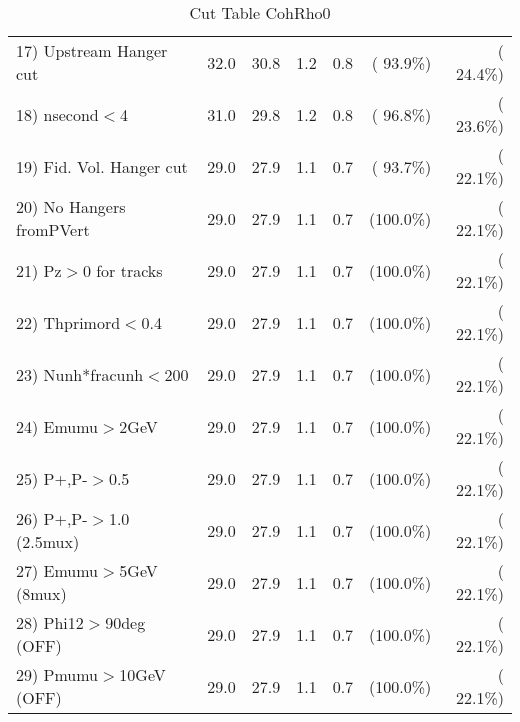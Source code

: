 \begin{table}[h!]
\begin{tabular}{||l||r|r|r|r|r|r||}
 17) Upstream Hanger cut  &         32.0 &         30.8 &          1.2 &          0.8 & ( 93.9\%) & ( 24.4\%) \\
 18) nsecond$<$4          &         31.0 &         29.8 &          1.2 &          0.8 & ( 96.8\%) & ( 23.6\%) \\
 19) Fid. Vol. Hanger cut &         29.0 &         27.9 &          1.1 &          0.7 & ( 93.7\%) & ( 22.1\%) \\
 20) No Hangers fromPVert &         29.0 &         27.9 &          1.1 &          0.7 & (100.0\%) & ( 22.1\%) \\
 21) Pz$>$0 for tracks    &         29.0 &         27.9 &          1.1 &          0.7 & (100.0\%) & ( 22.1\%) \\
 22) Thprimord$<$0.4      &         29.0 &         27.9 &          1.1 &          0.7 & (100.0\%) & ( 22.1\%) \\
 23) Nunh*fracunh$<$200   &         29.0 &         27.9 &          1.1 &          0.7 & (100.0\%) & ( 22.1\%) \\
 24) Emumu$>$2GeV         &         29.0 &         27.9 &          1.1 &          0.7 & (100.0\%) & ( 22.1\%) \\
 25) P+,P-$>$0.5          &         29.0 &         27.9 &          1.1 &          0.7 & (100.0\%) & ( 22.1\%) \\
 26) P+,P-$>$1.0 (2.5mux) &         29.0 &         27.9 &          1.1 &          0.7 & (100.0\%) & ( 22.1\%) \\
 27) Emumu$>$5GeV  (8mux) &         29.0 &         27.9 &          1.1 &          0.7 & (100.0\%) & ( 22.1\%) \\
 28) Phi12$>$90deg  (OFF) &         29.0 &         27.9 &          1.1 &          0.7 & (100.0\%) & ( 22.1\%) \\
 29) Pmumu$>$10GeV  (OFF) &         29.0 &         27.9 &          1.1 &          0.7 & (100.0\%) & ( 22.1\%) \\
 \hline
 \hline
 \end{tabular}
 \caption{Cut Table  CohRho0  }
 \label{tab-cutcohjpsi-mumu_cohrho0}
 \end{table}
